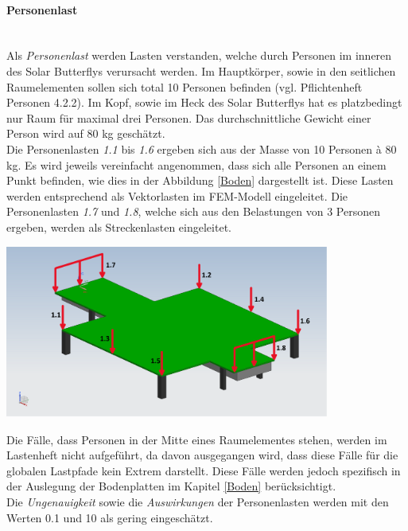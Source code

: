 \paragraph{Personenlast}\mbox{}\\
Als \emph{Personenlast} werden Lasten verstanden, welche durch Personen im inneren des Solar Butterflys verursacht werden. Im Hauptkörper, sowie in den seitlichen Raumelementen sollen sich total 10 Personen befinden (vgl. Pflichtenheft Personen 4.2.2). Im Kopf, sowie im Heck des Solar Butterflys hat es platzbedingt nur Raum für maximal drei Personen. Das durchschnittliche Gewicht einer Person wird auf 80 kg geschätzt.\\
Die Personenlasten \emph{1.1} bis \emph{1.6} ergeben sich aus der Masse von 10 Personen à 80 kg. Es wird jeweils vereinfacht angenommen, dass sich alle Personen an einem Punkt befinden, wie dies in der Abbildung \ref{Boden} dargestellt ist. Diese Lasten werden entsprechend als Vektorlasten im FEM-Modell eingeleitet. Die Personenlasten \emph{1.7} und \emph{1.8}, welche sich aus den Belastungen von 3 Personen ergeben, werden als Streckenlasten eingeleitet.

\begin{center}
  \includegraphics[width=0.8\textwidth]{04_Figures/BodenMitLasten.png}
  \label{Boden}
\end{center}

Die Fälle, dass Personen in der Mitte eines Raumelementes stehen, werden im Lastenheft nicht aufgeführt, da davon ausgegangen wird, dass diese Fälle für die globalen Lastpfade kein Extrem darstellt. Diese Fälle werden jedoch spezifisch in der Auslegung der Bodenplatten im Kapitel \ref{Boden} berücksichtigt.\\
Die \emph{Ungenauigkeit} sowie die \emph{Auswirkungen} der Personenlasten werden mit den Werten 0.1 und 10 als gering eingeschätzt.

